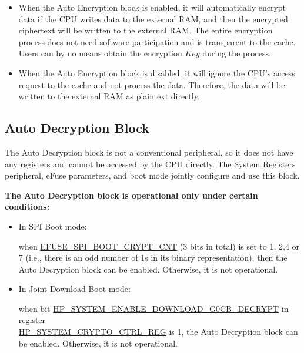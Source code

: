 \documentclass[main\_\_EN.tex]{subfiles}
\begin{document}
\begin{tiplisting}
\vspace{-2em}
\begin{itemize}

\item When the Auto Encryption block is enabled, it will automatically encrypt data if the CPU writes data to the external RAM, and then the encrypted ciphertext will be written to the external RAM. The entire encryption process does not need software participation and is transparent to the cache. Users can by no means obtain the encryption \begin{math}\mathit{Key}\end{math} during the process.

\item When the Auto Encryption block is disabled, it will ignore the CPU's access request to the cache and not process the data. Therefore, the data will be written to the external RAM as plaintext directly.

\end{itemize}
\end{tiplisting}

\subsection{Auto Decryption Block}

The Auto Decryption block is not a conventional peripheral, so it does not have any registers and cannot be accessed by the CPU directly. The System Registers peripheral, eFuse parameters, and boot mode jointly configure and use this block.

\textbf{The Auto Decryption block is operational only under certain conditions:}

\begin{itemize}

    \item In SPI Boot mode:

    when \hyperref[fielddesc:EFUSESPIBOOTCRYPTCNT]{EFUSE\_SPI\_BOOT\_CRYPT\_CNT} (3 bits in total) is set to 1, 2,4 or 7 (i.e., there is an odd number of 1s in its binary representation), then the Auto Decryption block can be enabled. Otherwise, it is not operational.

    \item In Joint Download Boot mode:

    when bit \hyperref[fielddesc:HPSYSTEMENABLEDOWNLOADG0CBDECRYPT]{HP\_SYSTEM\_ENABLE\_DOWNLOAD\_G0CB\_DECRYPT} in register\\ \hyperref[regdesc:HPSYSTEMCRYPTOCTRLREG]{HP\_SYSTEM\_CRYPTO\_CTRL\_REG} is 1, the Auto Decryption block can be enabled. Otherwise, it is not operational.
\end{itemize}
\end{document}
